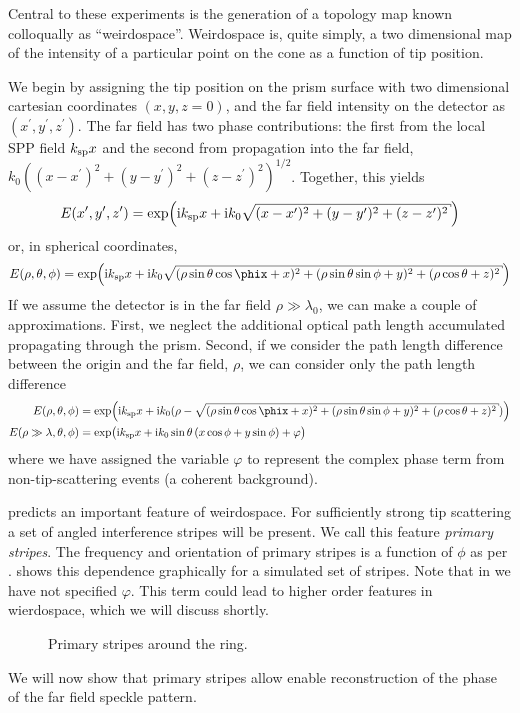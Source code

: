 Central to these experiments is the generation of a topology map known
colloqually as ``weirdospace''.  Weirdospace is, quite simply, a two
dimensional map of the intensity of a particular point on the cone as a
function of tip position.  

We begin by assigning the tip position on the
prism surface with two dimensional cartesian coordinates $(x,y,z=0)$, and
the far field intensity on the detector as $(x^\prime,y^\prime,z^\prime)$.
The far field has two phase contributions: the first from the local SPP field
$k_\mathrm{sp} x$ and the second from propagation into the far field,
$k_0\left((x-x^\prime)^2+ (y-y^\prime)^2+
(z-z^\prime)^2\right)^{1/2}$.  Together, this yields
\begin{equation}
E(x^\prime,y^\prime,z^\prime) = \exp\!\left( \mi\ksp x + %
\mi k_0\sqrt{ (x-x^\prime)^2+ (y-y^\prime)^2+ (z-z^\prime)^2 } \right)
\end{equation}
or, in spherical coordinates,
\begin{equation}
E(\rho,\theta,\phi) = \exp\!\left( \mi\ksp x + %
\mi k_0\sqrt{
(\rho\sin\theta\cos\phix+x)^2+(\rho\sin\theta\sin\phi+y)^2+(\rho\cos\theta+z)^2 } \right)
\end{equation}
If we assume the detector is in the far field $\rho\gg\lambda_0$, we can
make a couple of approximations.  First, we neglect the additional optical
path length accumulated propagating through the prism.  Second, if we
consider the path length difference between the origin and the far field,
$\rho$, we can consider only the path length difference
\begin{align}
E(\rho,\theta,\phi) &= \exp\!\left( \mi\ksp x + %
\mi k_0(\rho-\sqrt{ (\rho\sin\theta\cos\phix+x)^2+(\rho\sin\theta\sin\phi+y)^2+(\rho\cos\theta+z)^2
}) \right)\\
E(\rho\gg\lambda,\theta,\phi) &= \exp\!\big( \mi \ksp x
 + \mi k_0 \sin\theta \left(x\cos\phi+y\sin\phi\right)
 + \varphi\big)
	\label{eqn:primarystripes}
\end{align}
where we have assigned the variable $\varphi$ to represent the complex phase term
from non-tip-scattering events (a coherent background).  

 predicts an important feature of weirdospace.
For sufficiently strong tip scattering a set of angled interference stripes
will be present.  We call this feature \textit{primary stripes}.  The
frequency and orientation of primary stripes is a function of $\phi$ as per
.   shows this
dependence graphically for a simulated set of stripes.  Note that in
 we have not specified $\varphi$.  This term
could lead to higher order features in wierdospace, which we will discuss
shortly.
\begin{figure}
\centering
\caption{Primary stripes around the ring.}
\label{fig:primarystripes}
\end{figure}

We will now show that primary stripes allow enable reconstruction of the
phase of the far field speckle pattern.  
